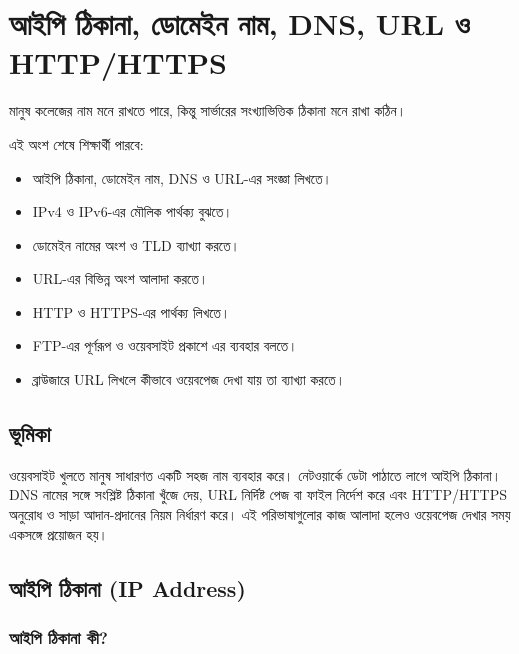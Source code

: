 \section{আইপি ঠিকানা, ডোমেইন নাম, DNS, URL ও HTTP/HTTPS}

মানুষ কলেজের নাম মনে রাখতে পারে, কিন্তু সার্ভারের সংখ্যাভিত্তিক ঠিকানা মনে রাখা কঠিন।



\begin{learningbox}
এই অংশ শেষে শিক্ষার্থী পারবে:
\begin{itemize}
\item আইপি ঠিকানা, ডোমেইন নাম, DNS ও URL-এর সংজ্ঞা লিখতে।
\item IPv4 ও IPv6-এর মৌলিক পার্থক্য বুঝতে।
\item ডোমেইন নামের অংশ ও TLD ব্যাখ্যা করতে।
\item URL-এর বিভিন্ন অংশ আলাদা করতে।
\item HTTP ও HTTPS-এর পার্থক্য লিখতে।
\item FTP-এর পূর্ণরূপ ও ওয়েবসাইট প্রকাশে এর ব্যবহার বলতে।
\item ব্রাউজারে URL লিখলে কীভাবে ওয়েবপেজ দেখা যায় তা ব্যাখ্যা করতে।
\end{itemize}
\end{learningbox}

\subsection{ভূমিকা}
ওয়েবসাইট খুলতে মানুষ সাধারণত একটি সহজ নাম ব্যবহার করে। নেটওয়ার্কে ডেটা পাঠাতে লাগে আইপি ঠিকানা। DNS নামের সঙ্গে সংশ্লিষ্ট ঠিকানা খুঁজে দেয়, URL নির্দিষ্ট পেজ বা ফাইল নির্দেশ করে এবং HTTP/HTTPS অনুরোধ ও সাড়া আদান-প্রদানের নিয়ম নির্ধারণ করে। এই পরিভাষাগুলোর কাজ আলাদা হলেও ওয়েবপেজ দেখার সময় একসঙ্গে প্রয়োজন হয়।

\subsection{আইপি ঠিকানা (IP Address)}

\subsubsection{আইপি ঠিকানা কী?}

